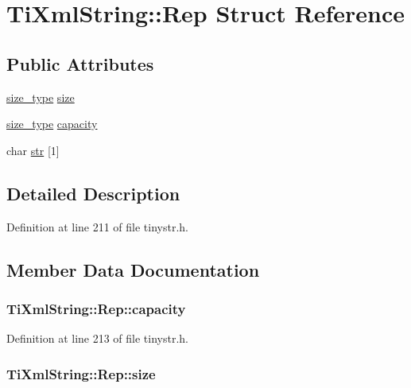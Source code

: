 \hypertarget{struct_ti_xml_string_1_1_rep}{
\section{TiXmlString::Rep Struct Reference}
\label{struct_ti_xml_string_1_1_rep}
}
\subsection*{Public Attributes}
\begin{DoxyCompactItemize}
\item 
\hyperlink{class_ti_xml_string_abeb2c1893a04c17904f7c06546d0b971}{size\_\-type} \hyperlink{struct_ti_xml_string_1_1_rep_a3470330fe806a575dbb5909a1b908ac1}{size}
\item 
\hyperlink{class_ti_xml_string_abeb2c1893a04c17904f7c06546d0b971}{size\_\-type} \hyperlink{struct_ti_xml_string_1_1_rep_a9f38da318212f4a2f6ebe0afdbfaf477}{capacity}
\item 
char \hyperlink{struct_ti_xml_string_1_1_rep_a88a7037a489827ec9e59b008e11342b0}{str} \mbox{[}1\mbox{]}
\end{DoxyCompactItemize}


\subsection{Detailed Description}


Definition at line 211 of file tinystr.h.



\subsection{Member Data Documentation}
\hypertarget{struct_ti_xml_string_1_1_rep_a9f38da318212f4a2f6ebe0afdbfaf477}{
\subsubsection[{capacity}]{ {\bf TiXmlString::Rep::capacity}}}
\label{struct_ti_xml_string_1_1_rep_a9f38da318212f4a2f6ebe0afdbfaf477}


Definition at line 213 of file tinystr.h.

\hypertarget{struct_ti_xml_string_1_1_rep_a3470330fe806a575dbb5909a1b908ac1}{
\subsubsection[{size}]{ {\bf TiXmlString::Rep::size}}}
\label{struct_ti_xml_string_1_1_rep_a3470330fe806a575dbb5909a1b908ac1}


